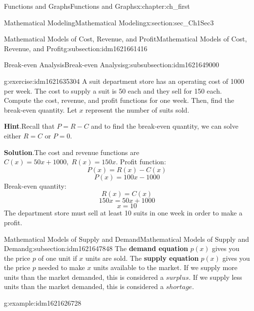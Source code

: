 \documentclass[oneside,10pt,]{book}
\newcommand{\blocktitlefont}{\relax}
\newcommand{\terminology}[1]{\textbf{#1}}
\numberwithin{equation}{section}
\begin{document}
\begin{chapterptx}{Functions and Graphs}{}{Functions and Graphs}{}{}{x:chapter:ch_first}
\begin{sectionptx}{Mathematical Modeling}{}{Mathematical Modeling}{}{}{x:section:sec_Ch1Sec3}
\begin{subsectionptx}{Mathematical Models of Cost, Revenue, and Profit}{}{Mathematical Models of Cost, Revenue, and Profit}{}{}{g:subsection:idm1621661416}
\begin{subsubsectionptx}{Break-even Analysis}{}{Break-even Analysis}{}{}{g:subsubsection:idm1621649000}
\begin{inlineexercise}{}{g:exercise:idm1621635304}%
A suit department store has an operating cost of \textdollar{}1000 per week. The cost to supply a suit is \textdollar{}50 each and they sell for \textdollar{}150 each. Compute the cost, revenue, and profit functions for one week. Then, find the break-even quantity. Let \(x\) represent the number of suits sold.%
\par\smallskip%
\noindent\textbf{\blocktitlefont Hint}.\hypertarget{g:hint:idm1621636072}{}\quad{}Recall that \(P=R-C\) and to find the break-even quantity, we can solve either \(R=C\) or \(P=0\).\par\smallskip%
\noindent\textbf{\blocktitlefont Solution}.\hypertarget{g:solution:idm1621635432}{}\quad{}The cost and revenue functions are \(C(x)=50x+1000,\;R(x)=150x.\)%
 Profit function:%
\begin{equation*}
P(x)=R(x)-C(x)
\end{equation*}
%
\begin{equation*}
P(x)=100x-1000
\end{equation*}
Break-even quantity:%
\begin{equation*}
R(x)=C(x)
\end{equation*}
%
\begin{equation*}
150x=50x+1000
\end{equation*}
%
\begin{equation*}
x=10
\end{equation*}
The department store must sell at least 10 suits in one week in order to make a profit.\end{inlineexercise}%
\end{subsubsectionptx}
\end{subsectionptx}
%
%
\typeout{************************************************}
\typeout{************************************************}
%
\begin{subsectionptx}{Mathematical Models of Supply and Demand}{}{Mathematical Models of Supply and Demand}{}{}{g:subsection:idm1621647848}
The \terminology{demand equation} \(p(x)\) gives you the price \(p\) of one unit if \(x\) units are sold. The \terminology{supply equation} \(p(x)\) gives you the price \(p\) needed to make \(x\) units available to the market. If we supply more units than the market demanded, this is considered a \(surplus\). If we supply less units than the market demanded, this is considered a \(shortage\).%
\begin{example}{}{g:example:idm1621626728}%

\end{example}
\end{subsectionptx}
\end{sectionptx}
\end{chapterptx}
\end{document}
